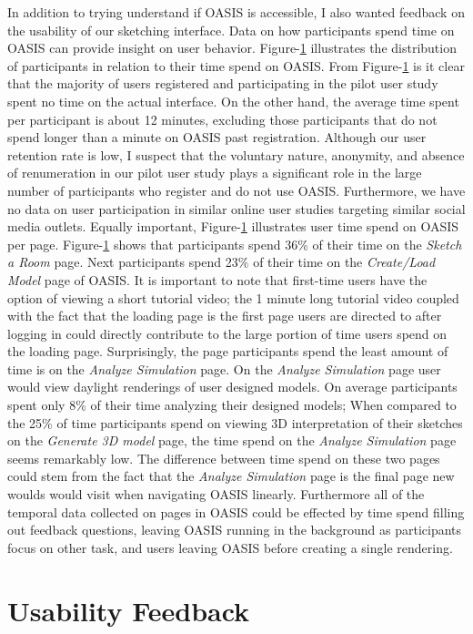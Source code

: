 In addition to trying understand if OASIS is accessible, I also wanted feedback on the usability of our sketching interface.
Data on how participants spend time on OASIS can provide insight on user behavior.
Figure-\ref{} illustrates the distribution of participants in relation to their time spend on OASIS.
From Figure-\ref{} is it clear that the majority of users registered and participating in the pilot user study spent no time on the actual interface.
On the other hand, the average time spent per participant is about 12 minutes, excluding those participants that do not spend longer than a minute on OASIS past registration.
Although our user retention rate is low, I suspect that the voluntary nature, anonymity, and absence of renumeration in our pilot user study plays a significant role in the large number of participants who register and do not use OASIS.
Furthermore, we have no data on user participation in similar online user studies targeting similar social media outlets.
Equally important, Figure-\ref{} illustrates user time spend on OASIS per page.
Figure-\ref{} shows that participants spend 36\% of their time on the \textit{Sketch a Room} page.
Next participants spend 23\% of their time on the \textit{Create/Load Model} page of OASIS.
It is important to note that first-time users have the option of viewing a short tutorial video; the 1 minute long tutorial video coupled with the fact that the loading page is the first page users are directed to after logging in could directly contribute to the large portion of time users spend on the loading page.
Surprisingly, the page participants spend the least amount of time is on the \textit{Analyze Simulation} page. 
On the \textit{Analyze Simulation} page user would view daylight renderings of user designed models.
On average participants spent only 8\% of their time analyzing their designed models;
When compared to the 25\% of time participants spend on viewing 3D interpretation of their sketches on the \textit{Generate 3D model} page, the time spend on the \textit{Analyze Simulation} page seems remarkably low.
The difference between time spend on these two pages could stem from the fact that the \textit{Analyze Simulation} page is the final page new woulds would visit when navigating OASIS linearly.
Furthermore all of the temporal data collected on pages in OASIS could be effected by time spend filling out feedback questions, leaving OASIS running in the background as participants focus on other task, and users leaving OASIS before creating a single rendering.

\section{Usability Feedback}

